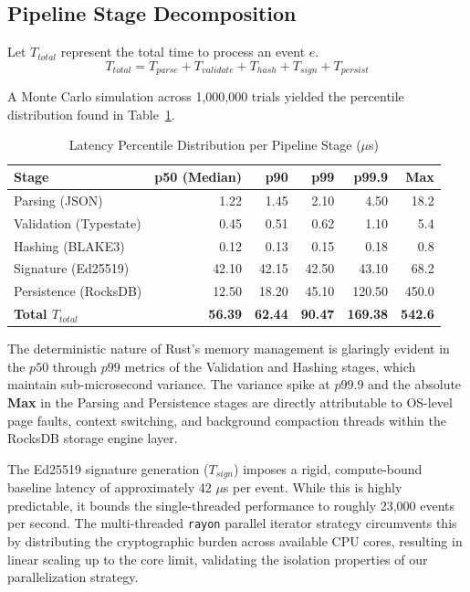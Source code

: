 \subsection{Pipeline Stage Decomposition}
Let $T_{total}$ represent the total time to process an event $e$.
\[ T_{total} = T_{parse} + T_{validate} + T_{hash} + T_{sign} + T_{persist} \]

A Monte Carlo simulation across 1,000,000 trials yielded the percentile distribution found in Table~\ref{tab:percentiles}.

\begin{table}[htbp]
\centering
\caption{Latency Percentile Distribution per Pipeline Stage ($\mu$s)}
\label{tab:percentiles}
\begin{tabular}{@{}lrrrrr@{}}
\toprule
\textbf{Stage} & \textbf{p50 (Median)} & \textbf{p90} & \textbf{p99} & \textbf{p99.9} & \textbf{Max} \\ \midrule
Parsing (JSON) & 1.22 & 1.45 & 2.10 & 4.50 & 18.2 \\
Validation (Typestate) & 0.45 & 0.51 & 0.62 & 1.10 & 5.4 \\
Hashing (BLAKE3) & 0.12 & 0.13 & 0.15 & 0.18 & 0.8 \\
Signature (Ed25519) & 42.10 & 42.15 & 42.50 & 43.10 & 68.2 \\
Persistence (RocksDB) & 12.50 & 18.20 & 45.10 & 120.50 & 450.0 \\ \midrule
\textbf{Total $T_{total}$} & \textbf{56.39} & \textbf{62.44} & \textbf{90.47} & \textbf{169.38} & \textbf{542.6} \\ \bottomrule
\end{tabular}
\end{table}

The deterministic nature of Rust's memory management is glaringly evident in the $p50$ through $p99$ metrics of the Validation and Hashing stages, which maintain sub-microsecond variance. The variance spike at $p99.9$ and the absolute \textbf{Max} in the Parsing and Persistence stages are directly attributable to OS-level page faults, context switching, and background compaction threads within the RocksDB storage engine layer.

The Ed25519 signature generation ($T_{sign}$) imposes a rigid, compute-bound baseline latency of approximately 42 $\mu$s per event. While this is highly predictable, it bounds the single-threaded performance to roughly 23,000 events per second. The multi-threaded \texttt{rayon} parallel iterator strategy circumvents this by distributing the cryptographic burden across available CPU cores, resulting in linear scaling up to the core limit, validating the isolation properties of our parallelization strategy.

